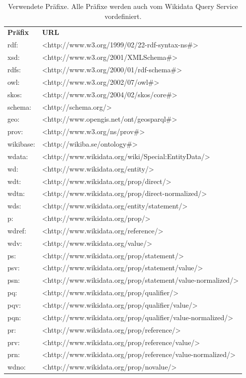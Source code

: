 \begin{table}
\begin{tabular}{l l}
\bfseries{Präfix} & \bfseries{URL} \\
rdf: & <http://www.w3.org/1999/02/22-rdf-syntax-ns\#> \\
xsd: & <http://www.w3.org/2001/XMLSchema\#> \\
rdfs: & <http://www.w3.org/2000/01/rdf-schema\#> \\
owl: & <http://www.w3.org/2002/07/owl\#> \\
skos: & <http://www.w3.org/2004/02/skos/core\#> \\
schema: & <http://schema.org/> \\
geo: & <http://www.opengis.net/ont/geosparql\#> \\
prov: & <http://www.w3.org/ns/prov\#> \\
wikibase: & <http://wikiba.se/ontology\#> \\
wdata: & <http://www.wikidata.org/wiki/Special:EntityData/> \\
wd: & <http://www.wikidata.org/entity/> \\
wdt: & <http://www.wikidata.org/prop/direct/> \\
wdtn: & <http://www.wikidata.org/prop/direct-normalized/> \\
wds: & <http://www.wikidata.org/entity/statement/> \\
p: & <http://www.wikidata.org/prop/> \\
wdref: & <http://www.wikidata.org/reference/> \\
wdv: & <http://www.wikidata.org/value/> \\
ps: & <http://www.wikidata.org/prop/statement/> \\
psv: & <http://www.wikidata.org/prop/statement/value/> \\
psn: & <http://www.wikidata.org/prop/statement/value-normalized/> \\
pq: & <http://www.wikidata.org/prop/qualifier/> \\
pqv: & <http://www.wikidata.org/prop/qualifier/value/> \\
pqn: & <http://www.wikidata.org/prop/qualifier/value-normalized/> \\
pr: & <http://www.wikidata.org/prop/reference/> \\
prv: & <http://www.wikidata.org/prop/reference/value/> \\
prn: & <http://www.wikidata.org/prop/reference/value-normalized/> \\
wdno: & <http://www.wikidata.org/prop/novalue/>
\end{tabular}
\caption{Verwendete Präfixe. Alle Präfixe werden auch vom Wikidata Query Service vordefiniert.}
\label{tab:rdf-prefixes}
\end{table}

